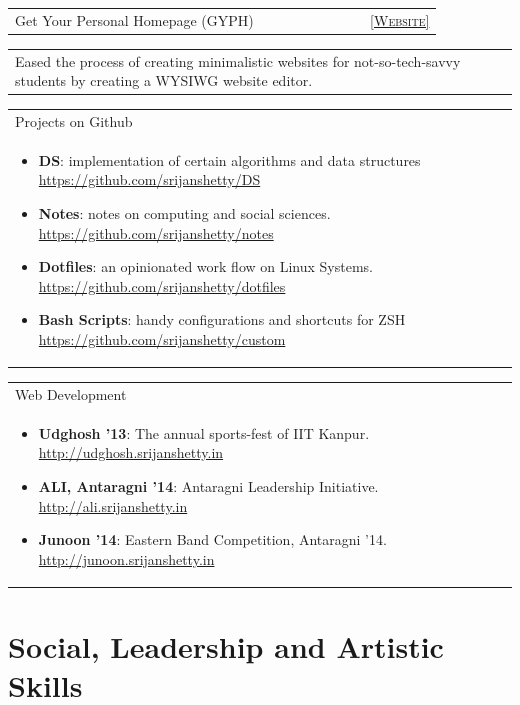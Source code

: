 \documentclass[a4paper,10pt]{article} %
\newcommand{\siproject}[3]{
    \begin{tabular}{p{0.85\linewidth}r}
        \textcolor{NavyBlue}{#2} & \multicolumn{1}{m{3cm}}{\raggedleft \textsc{#1}}\\
    \end{tabular}
    \begin{tabular}{p{\linewidth}}
    \vspace{-0.3cm}
        \footnotesize{#3}
    \end{tabular}
    \vspace{-0.3cm}
}
\newcommand{\projectlist}[2]{
    \begin{tabular}{p{\linewidth}}
        \textcolor{NavyBlue}{#1}\\
        \vspace{-0.3cm}
        \footnotesize{#2}
    \end{tabular}
    \vspace{-0.4cm}
}
\begin{document}
\siproject
    {\href{http://gyph2.herokuapp.com/} {[Website]}}
    {Get Your Personal Homepage (GYPH)}
    {Eased the process of creating minimalistic websites for not-so-tech-savvy students by creating a WYSIWG website editor. }

\projectlist
    {Projects on Github}
    {
     \begin{itemize}[leftmargin=0.5cm]
         \item \textbf{DS}: implementation of certain algorithms and data structures
             \href{https://github.com/srijanshetty/DS} {https://github.com/srijanshetty/DS}
         \item \textbf{Notes}: notes on computing and social sciences.
             \href{https://github.com/srijanshetty/notes} {https://github.com/srijanshetty/notes}
         \item \textbf{Dotfiles}: an opinionated work flow on Linux Systems.
             \href{https://github.com/srijanshetty/dotfiles} {https://github.com/srijanshetty/dotfiles}
         \item \textbf{Bash Scripts}: handy configurations and shortcuts for ZSH
             \href{https://github.com/srijanshetty/custom} {https://github.com/srijanshetty/custom}
     \end{itemize}
    }

\projectlist
    {Web Development}
    {
     \begin{itemize}[leftmargin=0.5cm]
         \item \textbf{Udghosh '13}: The annual sports-fest of IIT Kanpur.
             \href{http://udghosh.srijanshetty.in}{http://udghosh.srijanshetty.in}
         \item \textbf{ALI, Antaragni '14}: Antaragni Leadership Initiative.
             \href{http://ali.srijanshetty.in} {http://ali.srijanshetty.in}
         \item \textbf{Junoon '14}: Eastern Band Competition, Antaragni '14.
             \href{http://junoon.srijanshetty.in}{http://junoon.srijanshetty.in}
     \end{itemize}
    }


\section {Social, Leadership and Artistic Skills}
\end{document}
